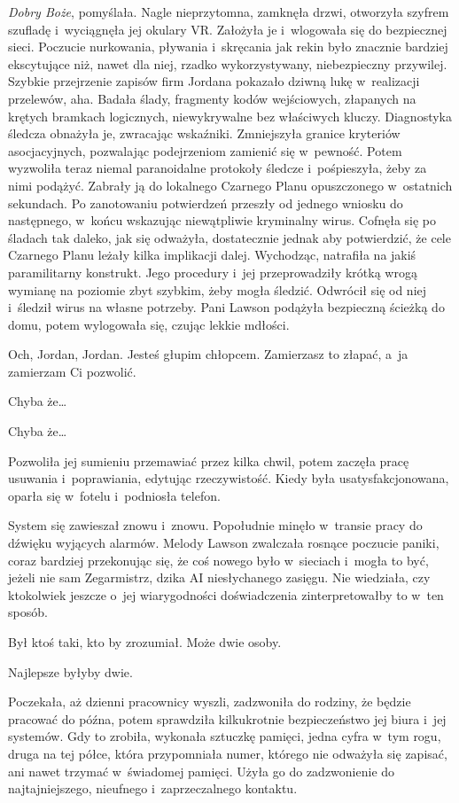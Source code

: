 \documentclass[oneside,polish,11pt,sfheadings]{mwbk}
\begin{document}
\emph{Dobry Boże}, pomyślała. Nagle nieprzytomna, zamknęła drzwi,
otworzyła szyfrem szufladę i~wyciągnęła jej okulary VR. Założyła je i~wlogowała się do bezpiecznej sieci. Poczucie nurkowania, pływania i~skręcania jak rekin było znacznie bardziej ekscytujące niż, nawet dla
niej, rzadko wykorzystywany, niebezpieczny przywilej. Szybkie
przejrzenie zapisów firm Jordana pokazało dziwną lukę w~realizacji
przelewów, aha. Badała ślady, fragmenty kodów wejściowych, złapanych na
krętych bramkach logicznych, niewykrywalne bez właściwych kluczy.
Diagnostyka śledcza obnażyła je, zwracając wskaźniki. Zmniejszyła
granice kryteriów asocjacyjnych, pozwalając podejrzeniom zamienić się w~pewność. Potem wyzwoliła teraz niemal paranoidalne protokoły śledcze i~pośpieszyła, żeby za nimi podążyć. Zabrały ją do lokalnego Czarnego
Planu opuszczonego w~ostatnich sekundach. Po zanotowaniu potwierdzeń
przeszły od jednego wniosku do następnego, w~końcu wskazując
niewątpliwie kryminalny wirus. Cofnęła się po śladach tak daleko, jak
się odważyła, dostatecznie jednak aby potwierdzić, że cele Czarnego
Planu leżały kilka implikacji dalej. Wychodząc, natrafiła na jakiś
paramilitarny konstrukt. Jego procedury i~jej przeprowadziły krótką
wrogą wymianę na poziomie zbyt szybkim, żeby mogła śledzić. Odwrócił się
od niej i~śledził wirus na własne potrzeby. Pani Lawson podążyła
bezpieczną ścieżką do domu, potem wylogowała się, czując lekkie mdłości.

Och, Jordan, Jordan. Jesteś głupim chłopcem. Zamierzasz to złapać, a~ja
zamierzam Ci pozwolić.

Chyba że\ldots

Chyba że\ldots

Pozwoliła jej sumieniu przemawiać przez kilka chwil, potem zaczęła pracę
usuwania i~poprawiania, edytując rzeczywistość. Kiedy była
usatysfakcjonowana, oparła się w~fotelu i~podniosła telefon.

System się zawieszał znowu i~znowu. Popołudnie minęło w~transie pracy do
dźwięku wyjących alarmów. Melody Lawson zwalczała rosnące poczucie
paniki, coraz bardziej przekonując się, że coś nowego było w~sieciach i~mogła to być, jeżeli nie sam Zegarmistrz, dzika AI niesłychanego
zasięgu. Nie wiedziała, czy ktokolwiek jeszcze o~jej wiarygodności
doświadczenia zinterpretowałby to w~ten sposób.

Był ktoś taki, kto by zrozumiał. Może dwie osoby.

Najlepsze byłyby dwie.

Poczekała, aż dzienni pracownicy wyszli, zadzwoniła do rodziny, że
będzie pracować do późna, potem sprawdziła kilkukrotnie bezpieczeństwo
jej biura i~jej systemów. Gdy to zrobiła, wykonała sztuczkę pamięci,
jedna cyfra w~tym rogu, druga na tej półce, która przypomniała numer,
którego nie odważyła się zapisać, ani nawet trzymać w~świadomej pamięci.
Użyła go do zadzwonienie do najtajniejszego, nieufnego i~zaprzeczalnego
kontaktu.
\end{document}
